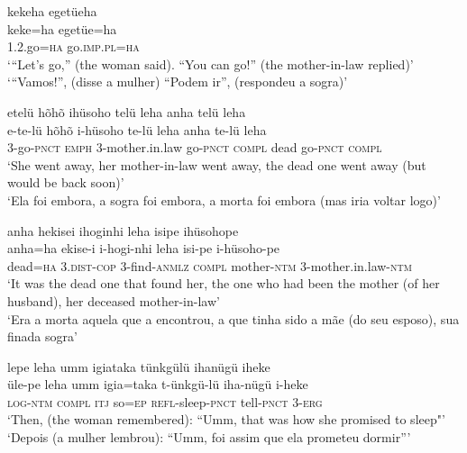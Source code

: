 \documentclass[output=paper,
modfonts,nonflat
]{langsci/langscibook}
\begin{document}
\ea kekeha egetüeha \\[.3em]
\gll keke=ha	egetüe=ha \\
1.2.go=\textsc{ha}	go.\textsc{imp.pl=ha} \\
\glt ‘“Let’s go,” (the woman said). “You can go!” (the mother-in-law replied)’ \\
‘“Vamos!”, (disse a mulher) “Podem ir”, (respondeu a sogra)’ \\
\z

\ea etelü hõhõ ihüsoho telü leha anha telü leha{\footnotemark} \\[.3em]
\gll e-te-lü		hõhõ	i-hüsoho	te-lü		leha	anha	te-lü	 	leha \\
3-go-\textsc{pnct} 	\textsc{emph}	3-mother.in.law	go-\textsc{pnct}	\textsc{compl}	dead	go-\textsc{pnct}	\textsc{compl} \\
\glt ‘She went away, her mother-in-law went away, the dead one went away (but would be back soon)’ \\
‘Ela foi embora, a sogra foi embora, a morta foi embora (mas iria voltar logo)’ \\
\z

\newpage 
\ea anha hekisei ihoginhi leha isipe ihüsohope \\[.3em]
\gll anha=ha	ekise-i		i-hogi-nhi	leha	isi-pe		i-hüsoho-pe \\
dead=\textsc{ha} 	3.\textsc{dist-cop} 	3-find-\textsc{anmlz}	\textsc{compl}	mother-\textsc{ntm} 	3-mother.in.law-\textsc{ntm} \\
\glt ‘It was the dead one that found her, the one who had been the mother (of her husband), her deceased mother-in-law’ \\
‘Era a morta aquela que a encontrou, a que tinha sido a mãe (do seu esposo), sua finada sogra’ \\
\z

\ea lepe leha umm igiataka tünkgülü ihanügü iheke{\footnotemark} \\[.3em]
\gll üle-pe		leha	umm	igia=taka	t-ünkgü-lü		iha-nügü	i-heke \\
\textsc{log-ntm} 	\textsc{compl}	\textsc{itj} 	so=\textsc{ep} 		\textsc{refl}-sleep-\textsc{pnct}	tell-\textsc{pnct} 	3-\textsc{erg} \\
\glt ‘Then, (the woman remembered): “Umm, that was how she promised to sleep"’\\
‘Depois (a mulher lembrou): “Umm, foi assim que ela prometeu dormir”’ \\
\z
\end{document}
